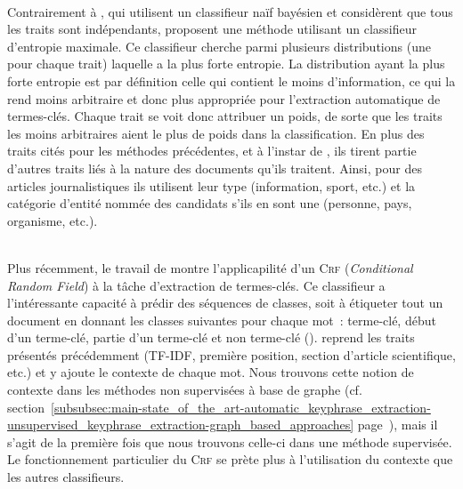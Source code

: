         ~\\Contrairement à , qui utilisent un classifieur
        naïf bayésien et considèrent que tous les traits sont indépendants,
         proposent une méthode utilisant un
        classifieur d'entropie maximale. Ce classifieur cherche parmi plusieurs
        distributions (une pour chaque trait) laquelle a la plus forte entropie.
        La distribution ayant la plus forte entropie est par définition celle
        qui contient le moins d'information, ce qui la rend moins arbitraire et
        donc plus appropriée pour l'extraction automatique de termes-clés.
        Chaque trait se voit donc attribuer un poids, de sorte que les traits
        les moins arbitraires aient le plus de poids dans la classification. En
        plus des traits cités pour les méthodes précédentes, et à l'instar de
        , ils tirent partie d'autres
        traits liés à la nature des documents qu'ils traitent. Ainsi, pour des
        articles journalistiques ils utilisent leur type (information, sport,
        etc.) et la catégorie d'entité nommée des candidats s'ils en sont une
        (personne, pays, organisme, etc.).

        ~\\Plus récemment, le travail de 
        montre l'applicapilité d'un \textsc{Crf} (\textit{Conditional Random
        Field}) à la tâche d'extraction de termes-clés. Ce classifieur a
        l'intéressante capacité à prédir des séquences de classes, soit à
        étiqueter tout un document en donnant les classes suivantes pour chaque
        mot~: \og{}terme-clé\fg{}, \og{}début d'un terme-clé\fg{}, \og{}partie
        d'un terme-clé\fg{} et \og{}non terme-clé\fg{} (). 
        reprend les traits présentés précédemment (TF-IDF, première position,
        section d'article scientifique, etc.) et y ajoute le contexte de
        chaque mot. Nous trouvons cette notion de contexte dans les méthodes non
        supervisées à base de graphe (cf.
        section~\ref{subsubsec:main-state_of_the_art-automatic_keyphrase_extraction-unsupervised_keyphrase_extraction-graph_based_approaches}
        page~\pageref{subsubsec:main-state_of_the_art-automatic_keyphrase_extraction-unsupervised_keyphrase_extraction-graph_based_approaches}),
        mais il s'agit de la première fois que nous trouvons celle-ci dans une
        méthode supervisée. Le fonctionnement particulier du \textsc{Crf} se
        prète plus à l'utilisation du contexte que les autres classifieurs.


